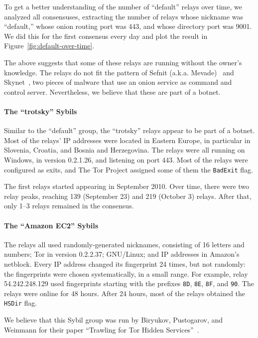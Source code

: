 To get a better understanding of the number of ``default'' relays over time, we
analyzed all consensuses, extracting the number of relays whose nickname was
``default,'' whose onion routing port was 443, and whose directory port was
9001.  We did this for the first consensus every day and plot the result in
Figure~\ref{fig:default-over-time}.

The above suggests that some of these relays are running without the owner's
knowledge.  The relays do not fit the pattern of Sefnit (a.k.a.
Mevade)~\cite{sefnit} and Skynet~\cite{skynet}, two pieces of malware that use
an onion service as command and control server.  Nevertheless, we believe that
these are part of a botnet.

\paragraph{The ``trotsky'' Sybils}
Similar to the ``default'' group, the ``trotsky'' relays appear to be part of
a botnet.  Most of the relays' IP addresses were located in Eastern Europe, in
particular in Slovenia, Croatia, and Bosnia and Herzegovina.  The relays were
all running on Windows, in version 0.2.1.26, and listening on port 443.  Most of
the relays were configured as exits, and The Tor Project assigned some of them
the \texttt{BadExit} flag.

The first relays started appearing in September 2010.  Over time, there were two
relay peaks, reaching 139 (September 23) and 219 (October 3) relays.  After
that, only 1--3 relays remained in the consensus.

\paragraph{The ``Amazon EC2'' Sybils}
The relays all used randomly-generated nicknames, consisting of 16 letters and
numbers; Tor in version 0.2.2.37; GNU/Linux; and IP addresses in Amazon's
netblock.  Every IP address changed its fingerprint 24 times, but not randomly:
the fingerprints were chosen systematically, in a small range.  For example,
relay 54.242.248.129 used fingerprints starting with the prefixes \texttt{8D},
\texttt{8E}, \texttt{8F}, and \texttt{90}.  The relays were online for 48 hours.
After 24 hours, most of the relays obtained the \texttt{HSDir} flag.

We believe that this Sybil group was run by Biryukov, Pustogarov, and Weinmann
for their paper ``Trawling for Tor Hidden Services''~\cite{Biryukov2013a}.


